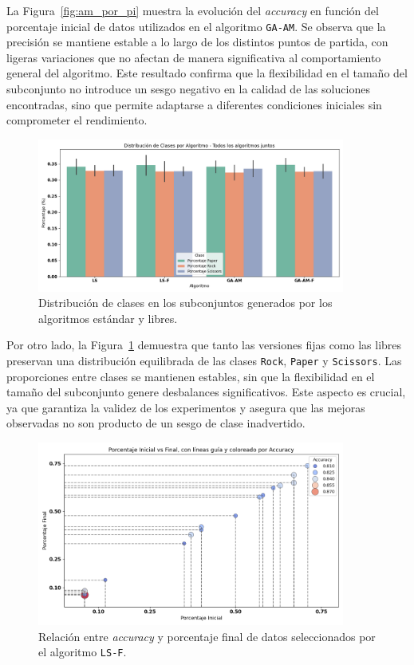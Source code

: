 La Figura~\ref{fig:am_por_pi} muestra la evolución del \textit{accuracy} en función del porcentaje inicial de datos utilizados en el algoritmo \texttt{GA-AM}.
Se observa que la precisión se mantiene estable a lo largo de los distintos puntos de partida,
con ligeras variaciones que no afectan de manera significativa al comportamiento general del algoritmo.
Este resultado confirma que la flexibilidad en el tamaño del subconjunto no introduce un sesgo negativo en la calidad de las soluciones encontradas,
sino que permite adaptarse a diferentes condiciones iniciales sin comprometer el rendimiento.


\begin{figure}[htp]
  \centering
  \includegraphics[width=0.9\textwidth]{imagenes/evaluaciones/libres/distribucion-clases.png}
  \caption{Distribución de clases en los subconjuntos generados por los algoritmos estándar y libres.}
  \label{fig:distribucion_libres}
\end{figure}

Por otro lado, la Figura~\ref{fig:distribucion_libres} demuestra que tanto las versiones fijas como las libres preservan una
distribución equilibrada de las clases \texttt{Rock}, \texttt{Paper} y \texttt{Scissors}.
Las proporciones entre clases se mantienen estables, sin que la flexibilidad en el tamaño del subconjunto genere desbalances significativos.
Este aspecto es crucial, ya que garantiza la validez de los experimentos y asegura que las mejoras observadas no son producto de un sesgo de clase inadvertido.


\begin{figure}[htp]
  \centering
  \includegraphics[width=0.9\textwidth]{imagenes/evaluaciones/libres/scatter_ls-f.png}
  \caption{Relación entre \textit{accuracy} y porcentaje final de datos seleccionados por el algoritmo \texttt{LS-F}.}
  \label{fig:scatter_bl_f}
\end{figure}


